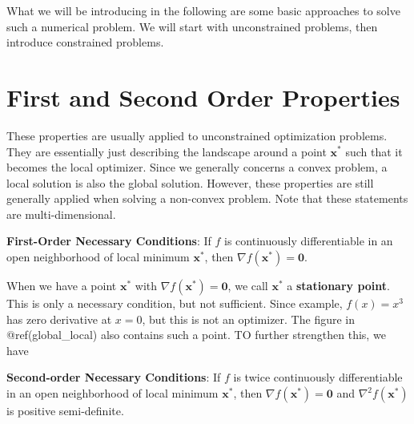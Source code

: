 \documentclass[
]{book}
\newenvironment{Shaded}{\begin{snugshade}}{\end{snugshade}}
\newcommand{\CommentTok}[1]{\textcolor[rgb]{0.56,0.35,0.01}{\textit{#1}}}
\newcommand{\DecValTok}[1]{\textcolor[rgb]{0.00,0.00,0.81}{#1}}
\newcommand{\DocumentationTok}[1]{\textcolor[rgb]{0.56,0.35,0.01}{\textbf{\textit{#1}}}}
\newcommand{\FunctionTok}[1]{\textcolor[rgb]{0.13,0.29,0.53}{\textbf{#1}}}
\newcommand{\NormalTok}[1]{#1}
\newcommand{\SpecialCharTok}[1]{\textcolor[rgb]{0.81,0.36,0.00}{\textbf{#1}}}
\theoremstyle{definition}
\theoremstyle{definition}
\theoremstyle{definition}
\theoremstyle{definition}
\theoremstyle{remark}
\begin{document}
\begin{Shaded}
\end{Shaded}

What we will be introducing in the following are some basic approaches to solve such a numerical problem. We will start with unconstrained problems, then introduce constrained problems.

\hypertarget{first-and-second-order-properties}{%
\section{First and Second Order Properties}\label{first-and-second-order-properties}}

These properties are usually applied to unconstrained optimization problems. They are essentially just describing the landscape around a point \(\mathbf{x}^\ast\) such that it becomes the local optimizer. Since we generally concerns a convex problem, a local solution is also the global solution. However, these properties are still generally applied when solving a non-convex problem. Note that these statements are multi-dimensional.

\textbf{First-Order Necessary Conditions}: If \(f\) is continuously differentiable in an open neighborhood of local minimum \(\mathbf{x}^\ast\), then \(\nabla f(\mathbf{x}^\ast) = \mathbf{0}\).

When we have a point \(\mathbf{x}^\ast\) with \(\nabla f(\mathbf{x}^\ast) = \mathbf{0}\), we call \(\mathbf{x}^\ast\) a \textbf{stationary point}. This is only a necessary condition, but not sufficient. Since example, \(f(x) = x^3\) has zero derivative at \(x = 0\), but this is not an optimizer. The figure in @ref(global\_local) also contains such a point. TO further strengthen this, we have

\textbf{Second-order Necessary Conditions}: If \(f\) is twice continuously differentiable in an open neighborhood of local minimum \(\mathbf{x}^\ast\), then \(\nabla f(\mathbf{x}^\ast) = \mathbf{0}\) and \(\nabla^2 f(\mathbf{x}^\ast)\) is positive semi-definite.
\end{document}
